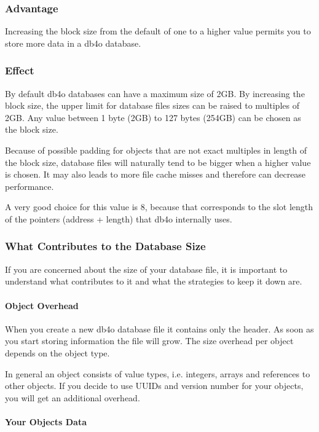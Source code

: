 \subsubsection*{Advantage}

Increasing the block size from the default of one to a higher value permits you to store more data in a db4o database.

\subsubsection*{Effect}

By default db4o databases can have a maximum size of 2GB. By increasing the block size, the upper limit for database files sizes can be raised to multiples of 2GB. Any value between 1 byte (2GB) to 127 bytes (254GB) can be chosen as the block size.

Because of possible padding for objects that are not exact multiples in length of the block size, database files will naturally tend to be bigger when a higher value is chosen. It may also leads to more file cache misses and therefore can decrease performance.

A very good choice for this value is 8, because that corresponds to the slot length of the pointers (address + length) that db4o internally uses.

\subsubsection{What Contributes to the Database Size}
\label{ref:troubleshoot-database-size}

If you are concerned about the size of your database file, it is important to understand what contributes to it and what the strategies to keep it down are.

\paragraph*{Object Overhead}

When you create a new db4o database file it contains only the header. As soon as you start storing information the file will grow. The size overhead per object depends on the object type.

In general an object consists of value types, i.e. integers, arrays and references to other objects. If you decide to use UUIDs and version number for your objects, you will get an additional overhead.

\paragraph*{Your Objects Data}

